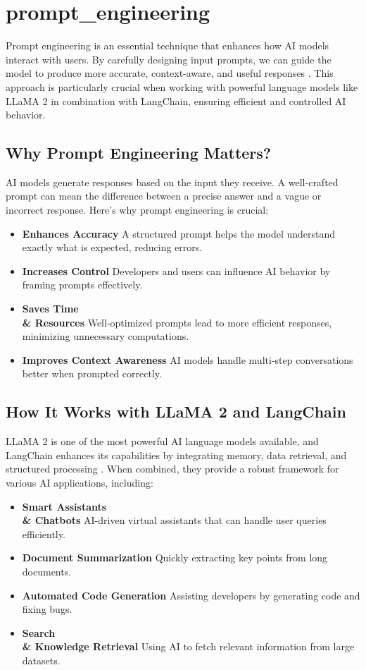 \section{prompt_engineering}
Prompt engineering is an essential technique that enhances how AI models interact with users. By carefully designing input prompts, we can guide the model to produce more accurate, context-aware, and useful responses \cite{brown2020language}. This approach is particularly crucial when working with powerful language models like LLaMA 2 in combination with LangChain, ensuring efficient and controlled AI behavior.

\subsection{Why Prompt Engineering Matters?}
AI models generate responses based on the input they receive. A well-crafted prompt can mean the difference between a precise answer and a vague or incorrect response. Here’s why prompt engineering is crucial:

\begin{itemize}
    \item \textbf{Enhances Accuracy}  A structured prompt helps the model understand exactly what is expected, reducing errors.
    \item \textbf{Increases Control}  Developers and users can influence AI behavior by framing prompts effectively.
    \item \textbf{Saves Time \\& Resources}  Well-optimized prompts lead to more efficient responses, minimizing unnecessary computations.
    \item \textbf{Improves Context Awareness}  AI models handle multi-step conversations better when prompted correctly.
\end{itemize}

\subsection{How It Works with LLaMA 2 and LangChain}
LLaMA 2 is one of the most powerful AI language models available, and LangChain enhances its capabilities by integrating memory, data retrieval, and structured processing \cite{touvron2023llama}. When combined, they provide a robust framework for various AI applications, including:

\begin{itemize}
    \item \textbf{Smart Assistants \\& Chatbots}  AI-driven virtual assistants that can handle user queries efficiently.
    \item \textbf{Document Summarization}  Quickly extracting key points from long documents.
    \item \textbf{Automated Code Generation}  Assisting developers by generating code and fixing bugs.
    \item \textbf{Search \\& Knowledge Retrieval} Using AI to fetch relevant information from large datasets.
\end{itemize}

